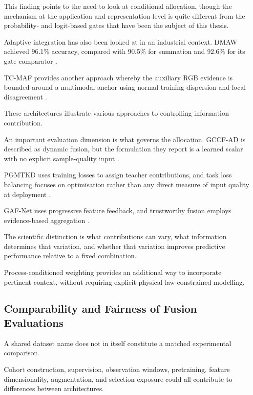 This finding points to the need to look at conditional allocation, though the mechanism at the
application and representation level is quite different from the probability- and logit-based gates
that have been the subject of this thesis.

Adaptive integration has also been looked at in an industrial context. DMAW achieved 96.1\%
accuracy, compared with 90.5\% for summation and 92.6\% for its gate comparator \parencite[PDF p.~9,
Table~V]{P003}.

TC-MAF provides another approach whereby the auxiliary RGB evidence is bounded around a multimodal
anchor using normal training dispersion and local disagreement \parencite[PDF pp.~3--5]{P026}.

These architectures illustrate various approaches to controlling information contribution.

An important evaluation dimension is what governs the allocation. GCCF-AD is described as dynamic
fusion, but the formulation they report is a learned scalar with no explicit sample-quality input
\parencite[p.~149226, Eq.~8]{P038}.

PGMTKD uses training losses to assign teacher contributions, and task loss balancing focuses on
optimisation rather than any direct measure of input quality at deployment
\parencite{Li2025PGMTKD,P045}.

GAF-Net uses progressive feature feedback, and trustworthy fusion employs evidence-based aggregation
\parencite{Huang2026Rolling,Ying2025Trustworthy}.

The scientific distinction is what contributions can vary, what information determines that
variation, and whether that variation improves predictive performance relative to a fixed
combination.

Process-conditioned weighting provides an additional way to incorporate pertinent context, without
requiring explicit physical law-constrained modelling.

\subsection{Comparability and Fairness of Fusion Evaluations}

A shared dataset name does not in itself constitute a matched experimental comparison.

Cohort construction, supervision, observation windows, pretraining, feature dimensionality,
augmentation, and selection exposure could all contribute to differences between architectures.

